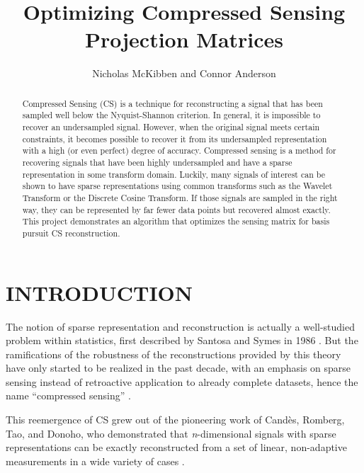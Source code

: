 \documentclass[journal]{IEEEtran}
\title{Optimizing Compressed Sensing Projection Matrices}
\author{Nicholas McKibben and Connor Anderson}
\begin{document}
\maketitle
\thispagestyle{empty}
\pagestyle{empty}
\begin{abstract}

Compressed Sensing (CS) is a technique for reconstructing a signal that has been sampled well below the Nyquist-Shannon criterion.  In general, it is impossible to recover an undersampled signal.  However, when the original signal meets certain constraints, it becomes possible to recover it from its undersampled representation with a high (or even perfect) degree of accuracy.  Compressed sensing is a method for recovering signals that have been highly undersampled and have a sparse representation in some transform domain.  Luckily, many signals of interest can be shown to have sparse representations using common transforms such as the Wavelet Transform or the Discrete Cosine Transform. If those signals are sampled in the right way, they can be represented by far fewer data points but recovered almost exactly.  This project demonstrates an algorithm that optimizes the sensing matrix for basis pursuit CS reconstruction.

\end{abstract}

\section{INTRODUCTION}

The notion of sparse representation and reconstruction is actually a well-studied problem within statistics, first described by Santosa and Symes in 1986 \cite{santosa}.  But the ramifications of the robustness of the reconstructions provided by this theory have only started to be realized in the past decade, with an emphasis on sparse sensing instead of retroactive application to already complete datasets, hence the name ``compressed sensing'' \cite{donoho}.

This reemergence of CS grew out of the pioneering work of Cand\`es, Romberg, Tao, and Donoho, who demonstrated that \emph{n}-dimensional signals with sparse representations can be exactly reconstructed from a set of linear, non-adaptive measurements in a wide variety of cases \cite{csbook,baraniuk,candes,donoho}.
\end{document}
